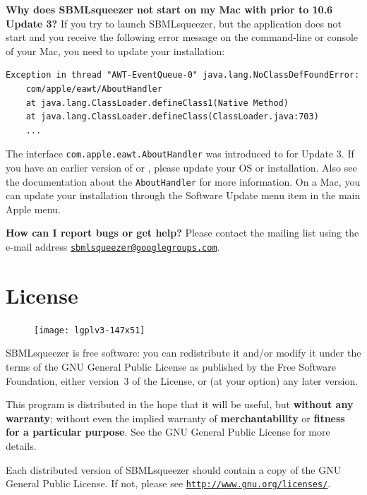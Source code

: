\noindent \textbf{Why does SBMLsqueezer not start on my Mac with \MacOSX prior to 10.6 Update 3?}\newline
If you try to launch SBMLsqueezer, but the application does not start and you receive the following error message on the command-line or \Java console of your Mac, you need to update your \Java installation:
\begin{verbatim}
Exception in thread "AWT-EventQueue-0" java.lang.NoClassDefFoundError:
    com/apple/eawt/AboutHandler
    at java.lang.ClassLoader.defineClass1(Native Method)
    at java.lang.ClassLoader.defineClass(ClassLoader.java:703)
    ...
\end{verbatim}
The interface \texttt{com.apple.eawt.AboutHandler} was introduced to \Java for  Update 3. If you have an earlier version of \MacOSX or \Java, please update your OS or \Java installation.
Also see the \MacOSX documentation about the \texttt{AboutHandler} for more information. On a Mac, you can update your \Java installation through the Software Update menu item in the main Apple menu.
\newline

\noindent \textbf{How can I report bugs or get help?}\newline
Please contact the mailing list using the e-mail address 
\href{mailto:sbmlsqueezer@googlegroups.com}{\texttt{sbmlsqueezer@google\-groups.com}}.

\chapter{License}

\begin{figure}
\vspace{\wrapfigspace}
\texttt{[image: lgplv3-147x51]}
\end{figure}
SBMLsqueezer is free software: you can redistribute it and/or modify
it under the terms of the GNU General Public License as published by
the Free Software Foundation, either version~3 of the License, or
(at your option) any later version.

This program is distributed in the hope that it will be useful,
but \textbf{without any warranty}; without even the implied warranty of
\textbf{merchantability} or \textbf{fitness for a particular purpose}. See the
GNU General Public License for more details.

Each distributed version of SBMLsqueezer should contain a copy of the 
GNU General Public License. If not, please see
\href{http://www.gnu.org/licenses/gpl-3.0-standalone.html}{\nolinkurl{http://www.gnu.org/licenses/}}.

